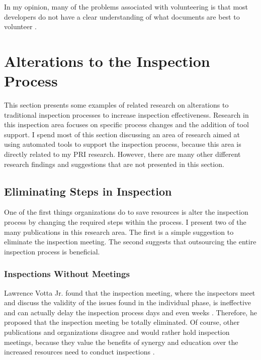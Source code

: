 In my opinion, many of the problems associated with volunteering is that
most developers do not have a clear understanding of what documents are
best to volunteer \cite{Wiegers98}.


\section{Alterations to the Inspection Process}
This section presents some examples of related research on alterations to
traditional inspection processes to increase inspection effectiveness.
Research in this inspection area focuses on specific process changes and
the addition of tool support. I spend most of this section discussing an
area of research aimed at using automated tools to support the inspection
process, because this area is directly related to my PRI research. However,
there are many other different research findings and suggestions that are
not presented in this section. 


\subsection{Eliminating Steps in Inspection}
One of the first things organizations do to save resources is alter the
inspection process by changing the required steps within the process. I
present two of the many publications in this research area. The first is a
simple suggestion to eliminate the inspection meeting. The second suggests
that outsourcing the entire inspection process is beneficial.

\subsubsection{Inspections Without Meetings}
Lawrence Votta Jr. found that the inspection meeting, where the inspectors
meet and discuss the validity of the issues found in the individual phase,
is ineffective and can actually delay the inspection process days and even
weeks \cite{Votta93, Glass99}. Therefore, he proposed that the inspection
meeting be totally eliminated. Of course, other publications and
organizations disagree and would rather hold inspection meetings, because
they value the benefits of synergy and education over the increased
resources need to conduct inspections \cite{Gilb98, Gilb99, Johnson98,
  Johnson98a}. 

